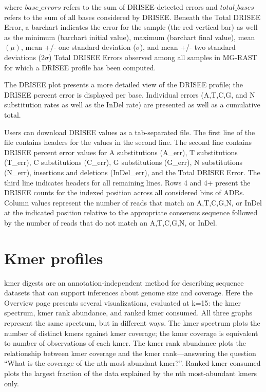 \documentclass[12pt,fullpage]{report}
\begin{document}
\noindent where ${base\_errors}$ refers to the sum of DRISEE-detected errors and ${total\_bases}$ refers to the sum of all bases considered by DRISEE.
Beneath the Total DRISEE Error, a barchart indicates the error for the sample (the red vertical bar) as well as the minimum (barchart initial value), maximum (barchart final value), mean \begin{math}(\mu)\end{math}, mean +/- one standard deviation (\begin{math}\sigma\end{math}), and mean +/- two standard deviations (\begin{math}2\sigma\end{math}) Total DRISEE Errors observed among all samples in MG-RAST for which a DRISEE profile has been computed.

The DRISEE plot presents a more detailed view of the DRISEE profile; the DRISEE percent error is displayed per base. Individual errors (A,T,C,G, and N substitution rates as well as the InDel rate) are presented as well as a cumulative total.

Users can download DRISEE values as a tab-separated file. The first line of the file contains headers for the values in the second line. The second line contains DRISEE percent error values for A substitutions (A\_err), T substitutions (T\_err), C substitutions (C\_err), G substitutions (G\_err), N substitutions (N\_err), insertions and deletions (InDel\_err), and the Total DRISEE Error. The third line indicates headers for all remaining lines. Rows 4 and 4+ present the DRISEE counts for the indexed position across all considered bins of ADRs. Column values represent the number of reads that match an A,T,C,G,N, or InDel at the indicated position relative to the appropriate consensus sequence followed by the number of reads that do not match an A,T,C,G,N, or InDel.
\section{Kmer profiles}

kmer digests are an annotation-independent method for describing sequence datasets that can support inferences about genome size and coverage. Here the Overview page presents several visualizations, evaluated at k=15:
the kmer spectrum, kmer rank abundance, and ranked kmer consumed. All three graphs represent the same spectrum, but in different ways. The kmer spectrum plots the number of distinct kmers against kmer coverage; the kmer coverage is equivalent to number of observations of each kmer. The kmer rank abundance plots the relationship between kmer coverage and the kmer rank---answering the question ``What is the coverage of the nth most-abundant kmer?''. Ranked kmer consumed plots the largest fraction of the data explained by the nth most-abundant kmers only.
\end{document}
